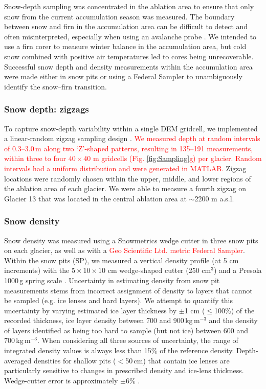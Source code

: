 \documentclass[twocolumn, letterpaper]{igs}
\begin{document}
Snow-depth sampling was concentrated in the ablation area to ensure that only snow from the current accumulation season was measured. The boundary between snow and firn in the accumulation area can be difficult to detect and often misinterpreted, especially when using an avalanche probe \citep{Grunewald2010,Sold2013}. We intended to use a firn corer to measure winter balance in the accumulation area, but cold snow combined with positive air temperatures led to cores being unrecoverable. Successful snow depth and density measurements within the accumulation area were made either in snow pits or using a Federal Sampler to unambiguously identify the snow--firn transition. 

\subsubsection{Snow depth: zigzags}

To capture snow-depth variability within a single DEM gridcell, we implemented a linear-random zigzag sampling design \citep{Shea2010}. \textcolor{red}{We measured depth at random intervals of 0.3--3.0\,m along two `Z'-shaped patterns, resulting in 135--191 measurements, within three to four $40\times40$ m gridcells (Fig. \ref{fig:Sampling}g) per glacier. Random intervals had a uniform distribution and were generated in MATLAB.} Zigzag locations were randomly chosen within the upper, middle, and lower regions of the ablation area of each glacier. We were able to measure a fourth zigzag on Glacier 13 that was located in the central ablation area at $\sim$2200 m a.s.l.

\subsubsection{Snow density}

Snow density was measured using a Snowmetrics wedge cutter in three snow pits on each glacier, as well as with a \textcolor{red}{Geo Scientific Ltd. metric Federal Sampler}. Within the snow pits (SP), we measured a vertical density profile (at 5 cm increments) with the $5\times10\times 10$ cm wedge-shaped cutter (250 cm$^3$) and a Presola 1000\,g spring scale \citep[e.g.][]{Gray1981,Fierz2009}. Uncertainty in estimating density from snow pit measurements stems from incorrect assignment of density to layers that cannot be sampled (e.g. ice lenses and hard layers). We attempt to quantify this uncertainty by varying estimated ice layer thickness by $\pm$1 cm ($\leq$100\%) of the recorded thickness, ice layer density between 700 and 900\,kg\,m$^{-3}$ and the density of layers identified as being too hard to sample (but not ice) between 600 and 700\,kg\,m$^{-3}$. When considering all three sources of uncertainty, the range of integrated density values is always less than 15\% of the reference density. Depth-averaged densities for shallow pits ($<$50\,cm) that contain ice lenses are particularly sensitive to changes in prescribed density and ice-lens thickness. Wedge-cutter error is approximately $\pm$6\% \citep[e.g.][]{Proksch2016,Carroll1977}.
\end{document}
